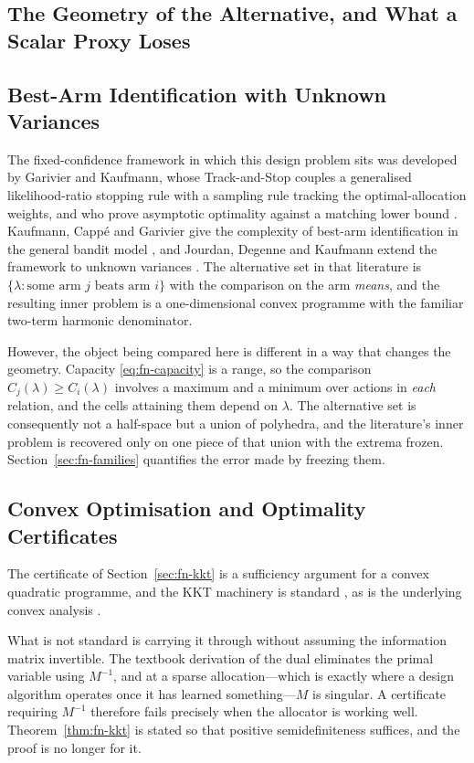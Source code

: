 \subsection{The Geometry of the Alternative, and What a Scalar Proxy Loses}

\subsection{Best-Arm Identification with Unknown Variances}

The fixed-confidence framework in which this design problem sits was developed by Garivier
and Kaufmann, whose Track-and-Stop couples a generalised likelihood-ratio stopping rule with
a sampling rule tracking the optimal-allocation weights, and who prove asymptotic optimality
against a matching lower bound \cite{garivier2016}. Kaufmann, Capp\'e and Garivier give the
complexity of best-arm identification in the general bandit model \cite{kaufmann2016}, and
Jourdan, Degenne and Kaufmann extend the framework to unknown variances \cite{jourdan2023}.
The alternative set in that literature is $\{\lambda:\text{some arm }j\text{ beats arm }i\}$
with the comparison on the arm \emph{means}, and the resulting inner problem is a
one-dimensional convex programme with the familiar two-term harmonic denominator.

However, the object being compared here is different in a way that changes the geometry.
Capacity \eqref{eq:fn-capacity} is a range, so the comparison $C_{j}(\lambda)\ge C_{i}(\lambda)$
involves a maximum and a minimum over actions in \emph{each} relation, and the cells
attaining them depend on $\lambda$. The alternative set is consequently not a half-space but
a union of polyhedra, and the literature's inner problem is recovered only on one piece of
that union with the extrema frozen. Section~\ref{sec:fn-families} quantifies the error made by
freezing them.

\subsection{Convex Optimisation and Optimality Certificates}

The certificate of Section~\ref{sec:fn-kkt} is a sufficiency argument for a convex quadratic
programme, and the KKT machinery is standard \cite{boyd2004}, as is the underlying convex
analysis \cite{rockafellar1970}.

What is not standard is carrying it through without assuming the information matrix
invertible. The textbook derivation of the dual eliminates the primal variable using
$M^{-1}$, and at a sparse allocation---which is exactly where a design algorithm operates
once it has learned something---$M$ is singular. A certificate requiring $M^{-1}$ therefore
fails precisely when the allocator is working well. Theorem~\ref{thm:fn-kkt} is stated so that
positive semidefiniteness suffices, and the proof is no longer for it.

